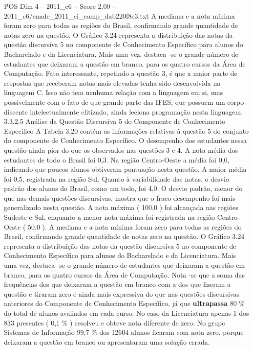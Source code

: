 \begin{textsample}{POS Dim 4 – 2011\_c6 – Score 2.00 – 2011\_c6/enade\_2011\_ci\_comp\_dab220f8e3.txt}
A mediana e a nota mínima foram zero para todas as regiões do Brasil, confirmando grande quantidade de notas zero na questão.
O Gráfico 3.24 representa a distribuição das notas da questão discursiva 5 no componente de Conhecimento Específico para alunos do Bacharelado e da Licenciatura.
Mais uma vez, destaca -se o grande número de estudantes que deixaram a questão em branco, para os quatro cursos da Área de Computação.
Fato interessante, repetindo a questão 3, é que a maior parte de respostas que receberam notas mais elevadas tenha sido desenvolvida na linguagem C.
Isso não tem nenhuma relação com a linguagem em si, mas possivelmente com o fato de que grande parte das IFES, que possuem um corpo discente intelectualmente elitizado, ainda leciona programação nesta linguagem. 3.3.2.5 Análise da Questão Discursiva 5 do Componente de Conhecimento Específico A Tabela 3.20 contém as informações relativas à questão 5 do conjunto do componente de Conhecimento Específico.
O desempenho dos estudantes nessa questão ainda pior do que os observados nas questões 3 e 4.
A nota média dos estudantes de todo o Brasil foi 0,3.
Na região Centro-Oeste a média foi 0,0, indicando que poucos alunos obtiveram pontuação nesta questão.
A maior média foi 0,5, registrada na região Sul.
Quanto à variabilidade das notas, o desvio padrão dos alunos do Brasil, como um todo, foi 4,0.
O desvio padrão, menor do que nas demais questões discursivas, mostra que o fraco desempenho foi mais generalizado nesta questão.
A nota máxima ( 100,0 ) foi alcançada nas regiões Sudeste e Sul, enquanto a menor nota máxima foi registrada na região Centro-Oeste ( 50,0 ).
A mediana e a nota mínima foram zero para todas as regiões do Brasil, confirmando grande quantidade de notas zero na questão.
O Gráfico 3.24 representa a distribuição das notas da questão discursiva 5 no componente de Conhecimento Específico para alunos do Bacharelado e da Licenciatura.
Mais uma vez, destaca -se o grande número de estudantes que deixaram a questão em branco, para os quatro cursos da Área de Computação.
Nota -se que a soma das frequências dos que deixaram a questão em branco com a dos que fizeram a questão e tiraram zero é ainda mais expressiva do que nas questões discursivas anteriores do Componente de Conhecimento Específico, já que \textbf{ultrapassa} 80 \% do total de alunos avaliados em cada curso.
No caso da Licenciatura apenas 1 dos 833 presentes ( 0,1 \% ) resolveu e obteve nota diferente de zero.
No grupo Sistemas de Informação 99,7 \% dos 12604 alunos ficaram com nota zero, porque deixaram a questão em branco ou apresentaram uma solução errada.

\end{textsample}
